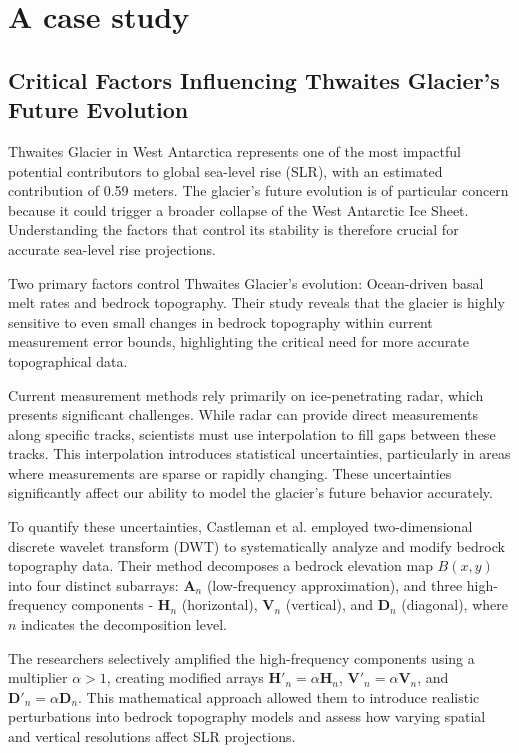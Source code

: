 \section{A case study}\label{Castleman_2022}
\subsection*{Critical Factors Influencing Thwaites Glacier's Future Evolution}

Thwaites Glacier in West Antarctica represents one of the most impactful potential contributors to global sea-level rise (SLR), with an estimated contribution of 0.59 meters. The glacier's future evolution is of particular concern because it could trigger a broader collapse of the West Antarctic Ice Sheet. Understanding the factors that control its stability is therefore crucial for accurate sea-level rise projections.

Two primary factors control Thwaites Glacier's evolution\cite{Castleman_2022}: Ocean-driven basal melt rates and bedrock topography. Their study reveals that the glacier is highly sensitive to even small changes in bedrock topography within current measurement error bounds, highlighting the critical need for more accurate topographical data.

Current measurement methods rely primarily on ice-penetrating radar, which presents significant challenges. While radar can provide direct measurements along specific tracks, scientists must use interpolation to fill gaps between these tracks. This interpolation introduces statistical uncertainties, particularly in areas where measurements are sparse or rapidly changing. These uncertainties significantly affect our ability to model the glacier's future behavior accurately.

To quantify these uncertainties, Castleman et al.\cite{Castleman_2022} employed two-dimensional discrete wavelet transform (DWT) to systematically analyze and modify bedrock topography data. Their method decomposes a bedrock elevation map $B(x,y)$ into four distinct subarrays: $\mathbf{A}_n$ (low-frequency approximation), and three high-frequency components - $\mathbf{H}_n$ (horizontal), $\mathbf{V}_n$ (vertical), and $\mathbf{D}_n$ (diagonal), where $n$ indicates the decomposition level. 

The researchers selectively amplified the high-frequency components using a multiplier $\alpha > 1$, creating modified arrays $\mathbf{H}'_n = \alpha\mathbf{H}_n$, $\mathbf{V}'_n = \alpha\mathbf{V}_n$, and $\mathbf{D}'_n = \alpha\mathbf{D}_n$. This mathematical approach allowed them to introduce realistic perturbations into bedrock topography models and assess how varying spatial and vertical resolutions affect SLR projections.

